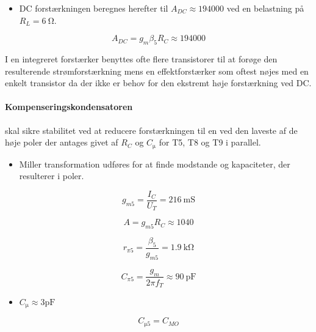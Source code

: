 \documentclass[danish]{article}
\begin{document}
\begin{itemize}
	\item DC forstærkningen beregnes herefter til $A_{DC} \approx 194000$ ved en belastning på $R_L = \SI{6}{\ohm}$.
\end{itemize}

\begin{equation}
A_{DC} = g_m \beta_5 R_C \approx 194000
\end{equation}

I en integreret forstærker benyttes ofte flere transistorer til at forøge den resulterende strømforstærkning mens en effektforstærker som oftest nøjes med en enkelt transistor da der ikke er behov for den ekstremt høje forstærkning ved DC. 

\paragraph{Kompenseringskondensatoren} skal sikre stabilitet ved at reducere forstærkningen til en ved den laveste af de høje poler der antages givet af $R_C$ og $C_{\si{\micro}}$ for T5, T8 og T9 i parallel.

\begin{itemize}
	\item Miller transformation udføres for at finde modstande og kapaciteter, der resulterer i poler.
\end{itemize}

\begin{equation} 
g_{m5} = \frac{I_C}{U_T} = \SI{216}{\milli\siemens}
\end{equation}

\begin{equation} 
A = g_{m5} R_C \approx 1040
\end{equation}

\begin{equation} 
r_{\pi 5} = \frac{\beta_5}{g_{m5}} = \SI{1.9}{\kilo\ohm}
\end{equation}

\begin{equation} 
C_{\si{\pi}5} = \frac{g_m}{2\pi f_T} \approx \SI{90}{\pico\farad}
\end{equation}

\begin{itemize}
	\item $C_{\si{\micro}} \approx 3 \si{\pico\farad}$
\end{itemize}

\begin{equation} 
C_{\si{\micro}5} = C_{MO}
\end{equation}
\end{document}
